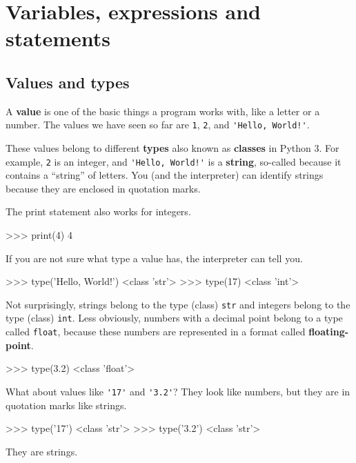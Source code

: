 \chapter{Variables, expressions and statements}

\section{Values and types}

A {\bf value} is one of the basic things a program works with,
like a letter or a
number.  The values we have seen so far
are {\tt 1}, {\tt 2}, and
\verb"'Hello, World!'".

These values belong to different {\bf types} also known as {\bf classes} in Python 3. For example,
{\tt 2} is an integer, and \verb"'Hello, World!'" is a {\bf string},
so-called because it contains a ``string'' of letters.
You (and the interpreter) can identify
strings because they are enclosed in quotation marks.


The print statement also works for integers.

\beforeverb
\begin{pyinterpreter}
>>> print(4)
4
\end{pyinterpreter}
\afterverb
%
If you are not sure what type a value has, the interpreter can tell you.

\beforeverb
\begin{pyinterpreter}
>>> type('Hello, World!')
<class 'str'>
>>> type(17)
<class 'int'>
\end{pyinterpreter}
\afterverb
%
Not surprisingly, strings belong to the type (class) {\tt str} and
integers belong to the type (class) {\tt int}.  Less obviously, numbers
with a decimal point belong to a type called {\tt float},
because these numbers are represented in a
format called {\bf floating-point}.


\beforeverb
\begin{pyinterpreter}
>>> type(3.2)
<class 'float'>
\end{pyinterpreter}
\afterverb
%
What about values like \verb"'17'" and \verb"'3.2'"?
They look like numbers, but they are in quotation marks like
strings.
%
%
\beforeverb
\begin{pyinterpreter}
>>> type('17')
<class 'str'>
>>> type('3.2')
<class 'str'>
\end{pyinterpreter}
\afterverb
%
They are strings.

